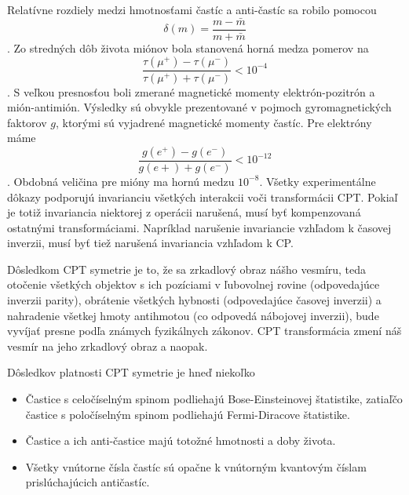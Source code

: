 \documentclass[../../main.tex]{subfiles}
\begin{document}
Relatívne rozdiely medzi hmotnosťami častíc a anti-častíc sa robilo pomocou $$\delta(m)=\frac{m-\bar{m}}{m+\bar{m}} $$. Zo stredných dôb života miónov bola stanovená horná medza pomerov na $$ \frac{\tau(\mu^+)-\tau(\mu^-)}{\tau(\mu^+)+\tau(\mu^-)}<10^{-4} $$. S veľkou presnosťou boli zmerané magnetické momenty elektrón-pozitrón a mión-antimión. Výsledky sú obvykle prezentované v pojmoch gyromagnetických faktorov $g$, ktorými sú vyjadrené magnetické momenty častíc. Pre elektróny máme $$ \frac{g(e^+)-g(e^-)}{g(e+)+g(e^-)}<10^{-12} $$. Obdobná veličina pre mióny ma hornú medzu $10^{-8}$. Všetky experimentálne dôkazy podporujú invarianciu všetkých interakcii voči transformácii CPT. Pokiaľ je totiž invariancia niektorej z operácii narušená, musí byť kompenzovaná ostatnými transformáciami. Napríklad narušenie invariancie vzhľadom k časovej inverzii, musí byť tiež narušená invariancia vzhľadom k CP.

Dôsledkom CPT symetrie je to, že sa zrkadlový obraz nášho vesmíru, teda otočenie všetkých objektov s ich pozíciami v ľubovolnej rovine (odpovedajúce inverzii parity), obrátenie všetkých hybnosti (odpovedajúce časovej inverzii) a nahradenie všetkej hmoty antihmotou (co odpovedá nábojovej inverzii), bude vyvíjať presne podľa známych fyzikálnych zákonov. CPT transformácia zmení náš vesmír na jeho zrkadlový obraz a naopak.

Dôsledkov platnosti CPT symetrie je hneď niekoľko
\begin{itemize}
	\item Častice s celočíselným spinom podliehajú Bose-Einsteinovej štatistike, zatiaľčo častice s poločíselným spinom podliehajú Fermi-Diracove štatistike.
	\item Častice a ich anti-častice majú totožné hmotnosti a doby života.
	\item Všetky vnútorne čísla častíc sú opačne k vnútorným kvantovým číslam prislúchajúcich antičastíc.
\end{itemize}
\end{document}
